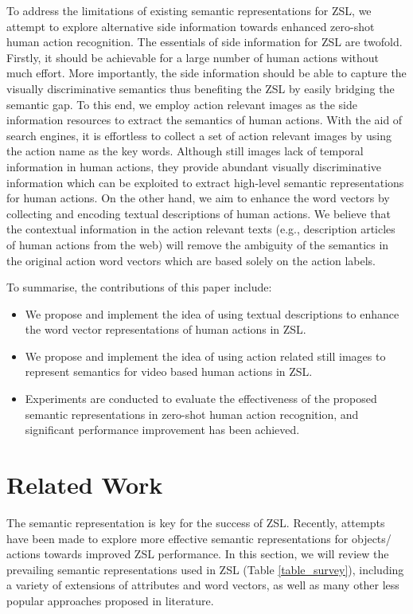 \documentclass[runningheads,a4paper] {llncs}
\begin{document}
To address the limitations of existing semantic representations for ZSL, we attempt to explore alternative side information towards enhanced zero-shot human action recognition. The essentials of side information for ZSL are twofold. Firstly, it should be achievable for a large number of human actions without much effort. More importantly, the side information should be able to capture the visually discriminative semantics thus benefiting the ZSL by easily bridging the semantic gap. To this end, we employ action relevant images as the side information resources to extract the semantics of human actions. With the aid of search engines, it is effortless to collect a set of action relevant images by using the action name as the key words. Although still images lack of temporal information in human actions, they provide abundant visually discriminative information which can be exploited to extract high-level semantic representations for human actions. On the other hand, we aim to enhance the word vectors by collecting and encoding textual descriptions of human actions. We believe that the contextual information in the action relevant texts (e.g., description articles of human actions from the web) will remove the ambiguity of the semantics in the original action word vectors which are based solely on the action labels.

To summarise, the contributions of this paper include:
\begin{itemize}
\item We propose and implement the idea of using textual descriptions to enhance the word vector representations of human actions in ZSL.
\item We propose and implement the idea of using action related still images to represent semantics for video based human actions in ZSL.
\item Experiments are conducted to evaluate the effectiveness of the proposed semantic representations in zero-shot human action recognition, and significant performance improvement has been achieved.
\end{itemize}
\section{Related Work}


The semantic representation is key for the success of ZSL. Recently, attempts have been made to explore more effective semantic representations for objects/ actions towards improved ZSL performance. In this section, we will review the prevailing semantic representations used in ZSL (Table \ref{table_survey}), including a variety of extensions of attributes and word vectors, as well as many other less popular approaches proposed in literature.
\end{document}

